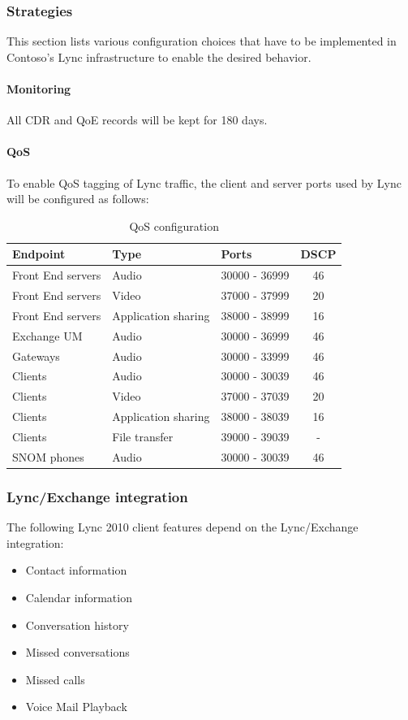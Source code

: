 	
	\subsubsection{Strategies}
	
		This section lists various configuration choices that have to be implemented in Contoso's Lync infrastructure to enable the desired behavior.
		
		\paragraph{Monitoring} All CDR and QoE records will be kept for 180 days.
		
		\paragraph{QoS} To enable QoS tagging of Lync traffic, the client and server ports used by Lync will be configured as follows:

		\begin{table}[H]
		\centering
		\begin{tabular}{lllc}
			Endpoint & Type & Ports & DSCP  \\ \hline 
			Front End servers & Audio & 30000 - 36999 & 46 \\
			Front End servers & Video & 37000 - 37999 & 20 \\
			Front End servers & Application sharing & 38000 - 38999 & 16 \\
			Exchange UM & Audio & 30000 - 36999 & 46 \\
			Gateways & Audio & 30000 - 33999 & 46 \\
			Clients & Audio & 30000 - 30039 & 46 \\
			Clients & Video & 37000 - 37039 & 20 \\
			Clients & Application sharing & 38000 - 38039 & 16 \\
			Clients & File transfer & 39000 - 39039 & - \\
			SNOM phones & Audio & 30000 - 30039 & 46 \\
		\end{tabular}
		\caption{\label{tab:case_qos} QoS configuration}
		\end{table}
	
	
	\subsubsection{Lync/Exchange integration}
	The following Lync 2010 client features depend on the Lync/Exchange integration:
	\begin{itemize}
		\item Contact information
		\item Calendar information
		\item Conversation history
		\item Missed conversations
		\item Missed calls
		\item Voice Mail Playback
	\end{itemize}


